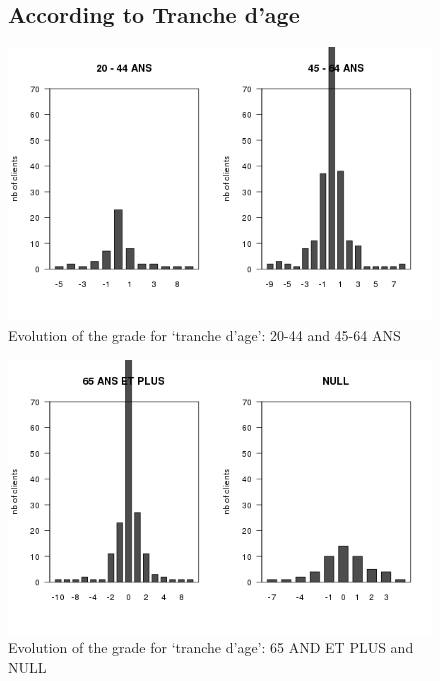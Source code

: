 \documentclass[a4paper, 11pt]{article}
\begin{document}
    \begin{figure}[!ht]
			\subsection{According to Tranche d'age}
            \centering
            \includegraphics[height = 10 cm]{Remi/Evolution_of_the_grade_for_tranche_d_age_45-64-ANS.png}
            \caption{Evolution of the grade for `tranche d'age': 20-44 and 45-64 ANS}
            \label{fig:e_age_45 - 64 ANS}
    \end{figure}

    \begin{figure}[!ht]
            \centering
            \includegraphics[height = 10 cm]{Remi/Evolution_of_the_grade_for_tranche_d_age_NULL.png}
            \caption{Evolution of the grade for `tranche d'age': 65 AND ET PLUS and NULL}
            \label{fig:e_age_NULL}
    \end{figure}
\end{document}
